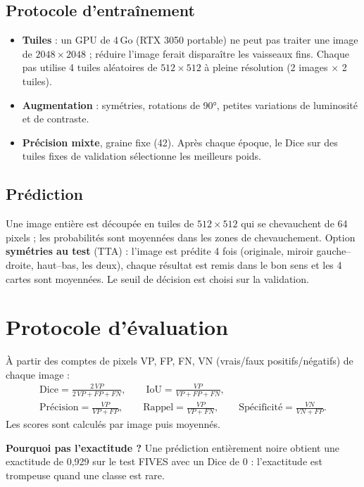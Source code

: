 \documentclass[11pt,a4paper]{article}
\begin{document}
\subsection{Protocole d'entraînement}
\begin{itemize}
  \item \textbf{Tuiles} : un GPU de 4\,Go (RTX 3050 portable) ne peut pas traiter une image de $2048\times2048$ ; réduire l'image ferait disparaître les vaisseaux fins. Chaque pas utilise 4 tuiles aléatoires de $512\times512$ à pleine résolution (2 images $\times$ 2 tuiles).
  \item \textbf{Augmentation} : symétries, rotations de 90°, petites variations de luminosité et de contraste.
  \item \textbf{Précision mixte}, graine fixe (42). Après chaque époque, le Dice sur des tuiles fixes de validation sélectionne les meilleurs poids.
\end{itemize}

\subsection{Prédiction}
Une image entière est découpée en tuiles de $512\times512$ qui se chevauchent de 64 pixels ; les probabilités sont moyennées dans les zones de chevauchement. Option \textbf{symétries au test} (TTA) : l'image est prédite 4 fois (originale, miroir gauche--droite, haut--bas, les deux), chaque résultat est remis dans le bon sens et les 4 cartes sont moyennées. Le seuil de décision est choisi sur la validation.

\section{Protocole d'évaluation}

À partir des comptes de pixels VP, FP, FN, VN (vrais/faux positifs/négatifs) de chaque image :
\begin{gather*}
\text{Dice}=\frac{2\,VP}{2\,VP+FP+FN},\qquad
\text{IoU}=\frac{VP}{VP+FP+FN},\\[4pt]
\text{Précision}=\frac{VP}{VP+FP},\qquad
\text{Rappel}=\frac{VP}{VP+FN},\qquad
\text{Spécificité}=\frac{VN}{VN+FP}.
\end{gather*}
Les scores sont calculés par image puis moyennés.

\textbf{Pourquoi pas l'exactitude ?} Une prédiction entièrement noire obtient une exactitude de 0,929 sur le test FIVES avec un Dice de 0 : l'exactitude est trompeuse quand une classe est rare.
\end{document}
